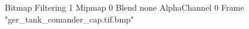 {Bitmap
	{Filtering 1}
	{Mipmap 0}
	{Blend none}
	{AlphaChannel 0}
	{Frame "ger_tank_comander_cap.tif.bmp"}
}
